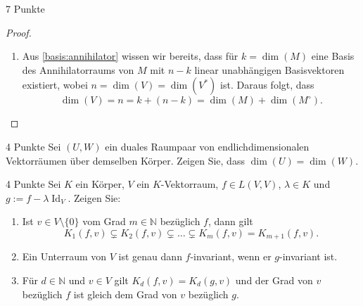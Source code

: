\documentclass{problemset}
\begin{document}
\begin{problem}{7 Punkte}
\begin{proof}
\begin{enumerate}
        \item Aus \autoref{basis:annihilator} wissen wir bereits, dass für \(k
              = \dim(M)\) eine Basis des Annihilatorraums von \(M\) mit \(n -
              k\) linear unabhängigen Basisvektoren existiert, wobei \(n =
              \dim(V) = \dim(V^*)\) ist. Daraus folgt, dass
              \begin{equation*}
                  \dim(V) = n = k + (n - k) = \dim(M) + \dim(M^\circ).
              \end{equation*}
    \end{enumerate}
\end{proof}
\end{problem}

\begin{problem}{4 Punkte}
Sei $(U, W)$ ein duales Raumpaar von endlichdimensionalen Vektorräumen über
demselben Körper. Zeigen Sie, dass $\dim(U) = \dim(W)$.
\end{problem}

\begin{problem}[\textit{[LM21, Aufgaben 16.1, 16.3, 16.4]}]{4 Punkte}
Sei $K$ ein Körper, $V$ ein $K$-Vektorraum, $f \in L(V, V)$, $\lambda \in K$
und $g := f - \lambda \operatorname{Id}_V$. Zeigen Sie:
\begin{enumerate}
    \item Ist $v \in V \setminus \{0\}$ vom Grad $m \in \mathbb{N}$ bezüglich
          $f$, dann gilt
          \[
              K_1(f, v) \subsetneq K_2(f, v) \subsetneq \ldots \subsetneq K_m(f, v) = K_{m+1}(f, v).
          \]
    \item Ein Unterraum von $V$ ist genau dann $f$-invariant, wenn er
          $g$-invariant ist.
    \item Für $d \in \mathbb{N}$ und $v \in V$ gilt $K_d(f, v) = K_d(g, v)$ und
          der Grad von $v$ bezüglich $f$ ist gleich dem Grad von $v$ bezüglich
          $g$.
\end{enumerate}
\end{problem}
\end{document}
